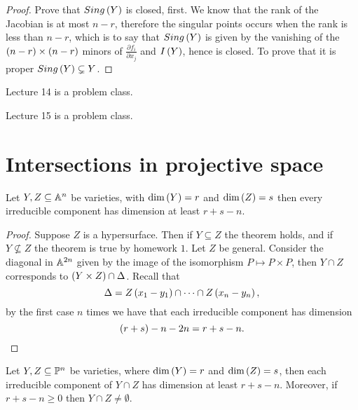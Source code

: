 \begin{proof}
Prove that $ Sing\rb{Y} $ is closed, first. We know that the rank of the Jacobian is at most $ n - r $, therefore the singular points occurs when the rank is less than $ n - r $, which is to say that $ Sing\rb{Y} $ is given by the vanishing of the $ \rb{n - r} \times \rb{n - r} $ minors of $ \tfrac{\partial f_i}{\partial x_j} $ and $ I\rb{Y} $, hence is closed. To prove that it is proper $ Sing\rb{Y} \subsetneq Y $.
\end{proof}


Lecture 14 is a problem class.


Lecture 15 is a problem class.

\pagebreak

\section{Intersections in projective space}


\begin{theorem}
Let $ Y, Z \subseteq \A^n $ be varieties, with $ \dim\rb{Y} = r $ and $ \dim\rb{Z} = s $ then every irreducible component has dimension at least $ r + s - n $.
\end{theorem}

\begin{proof}
Suppose $ Z $ is a hypersurface. Then if $ Y \subseteq Z $ the theorem holds, and if $ Y \nsubseteq Z $ the theorem is true by homework $ 1 $. Let $ Z $ be general. Consider the diagonal in $ \A^{2n} $ given by the image of the isomorphism $ P \mapsto P \times P $, then $ Y \cap Z $ corresponds to $ \rb{Y \times Z} \cap \Delta $. Recall that
$$ \Delta = Z\rb{x_1 - y_1} \cap \dots \cap Z\rb{x_n - y_n}, $$
by the first case $ n $ times we have that each irreducible component has dimension
$$ \rb{r + s} - n - 2n = r + s - n. $$
\end{proof}

\begin{theorem}
Let $ Y, Z \subseteq \P^n $ be varieties, where $ \dim\rb{Y} = r $ and $ \dim\rb{Z} = s $, then each irreducible component of $ Y \cap Z $ has dimension at least $ r + s - n $. Moreover, if $ r + s - n \ge 0 $ then $ Y \cap Z \ne \emptyset $.
\end{theorem}

